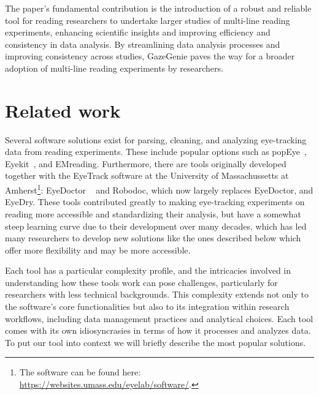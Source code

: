 \documentclass[twocolumn]{article}
\begin{document}
The paper's fundamental contribution is the introduction of a robust and reliable tool for reading researchers to undertake larger studies of multi-line reading experiments, enhancing scientific insights and improving efficiency and consistency in data analysis. By streamlining data analysis processes and improving consistency across studies, GazeGenie paves the way for a broader adoption of multi-line reading experiments by researchers.

\section{Related work}
Several software solutions exist for parsing, cleaning, and analyzing eye-tracking data from reading experiments. These include popular options such as popEye~\cite{schroederPopEyePackageAnalyse2022}, Eyekit~\cite{carrEyekit2019}, and EMreading\cite{vasilevMartinvasilevEMreading2023}. Furthermore, there are tools originally developed together with the EyeTrack software at the University of Massachussetts at Amherst\footnote{The software can be found here: \url{https://websites.umass.edu/eyelab/software/}.}: EyeDoctor ~\cite{stracuzziEyeDoctorSoftware2004} and Robodoc, which now largely replaces EyeDoctor, and EyeDry. These tools contributed greatly to making eye-tracking experiments on reading more accessible and standardizing their analysis, but have a somewhat steep learning curve due to their development over many decades, which has led many researchers to develop new solutions like the ones described below which offer more flexibility and may be more accessible.

Each tool has a particular complexity profile, and the intricacies involved in understanding how these tools work can pose challenges, particularly for researchers with less technical backgrounds. This complexity extends not only to the software's core functionalities but also to its integration within research workflows, including data management practices and analytical choices. Each tool comes with its own idiosyncrasies in terms of how it processes and analyzes data.
To put our tool into context we will briefly describe the most popular solutions.
\end{document}

